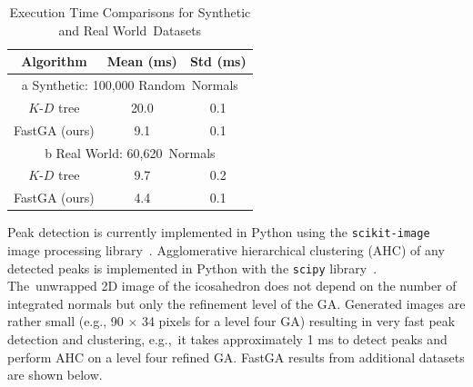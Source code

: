 \begin{table}[H]
    \centering
    \caption{Execution Time Comparisons for Synthetic and Real World~Datasets} \label{table:ch3_results_fastga}%
   
       
       \begin{tabular}{@{}ccc@{}}
        \toprule
        \textbf{Algorithm} & \textbf{Mean (ms)} & \textbf{Std (ms)} \\ \midrule
        \multicolumn{3}{c}{ a Synthetic: 100,000 Random~Normals} \\ \midrule
        $K$-$D$ tree    & 20.0      & 0.1      \\
        FastGA (ours)  & 9.1       & 0.1      \\ \midrule
     \multicolumn{3}{c}{ b Real World: 60,620~Normals} \\ \midrule
        
        $K$-$D$ tree & 9.7       & 0.2      \\
        FastGA (ours)      & 4.4       & 0.1      \\ \bottomrule
        \end{tabular}
\end{table}

Peak detection is currently implemented in Python using the \texttt{scikit-image} image processing library~\cite{van_der_walt_scikit-image_2014}. Agglomerative hierarchical clustering (AHC) of any detected peaks is implemented in Python with the \texttt{scipy} library~\cite{virtanen_scipy_2020}. The~unwrapped 2D image of the icosahedron does not depend on the number of integrated normals but only the refinement level of the GA. Generated images are rather small (e.g., 90 $\times$ 34 pixels for a level four GA) resulting in very fast peak detection and clustering, e.g.,~it takes approximately 1 ms to detect peaks and perform AHC on a level four refined GA.  FastGA results from additional datasets are shown below. %

